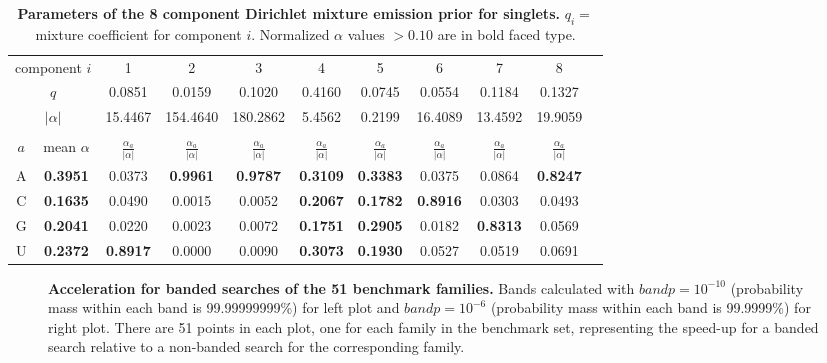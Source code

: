 \documentclass[11pt]{article}
\begin{document}
\begin{table}
\footnotesize
\begin{center}
\begin{tabular}{|c|c|c|c|c|c|c|c|c|c|c|} \hline
\multicolumn{2}{|c|}{component $i$} & 1 & 2 & 3 & 4 & 5 & 6 & 7 & 8 \\
\multicolumn{2}{|c|}{$q$} & 0.0851 & 0.0159 & 0.1020 & 0.4160 & 0.0745 & 0.0554 & 0.1184 & 0.1327 \\  
\multicolumn{2}{|c|}{$|\alpha|$} & 15.4467 & 154.4640 & 180.2862 & 5.4562 & 0.2199 & 16.4089 & 13.4592 & 19.9059 \\ \hline 
\multicolumn{10}{c}{} \\ \hline

$a$ & mean $\alpha$ & $\frac{\alpha_a}{|\alpha|}$ & $\frac{\alpha_a}{|\alpha|}$ & $\frac{\alpha_a}{|\alpha|}$ & $\frac{\alpha_a}{|\alpha|}$ & $\frac{\alpha_a}{|\alpha|}$ & $\frac{\alpha_a}{|\alpha|}$ & $\frac{\alpha_a}{|\alpha|}$ & $\frac{\alpha_a}{|\alpha|}$ \\ \hline 
A & \textbf{0.3951} & 0.0373 & \textbf{0.9961} & \textbf{0.9787} & \textbf{0.3109} & \textbf{0.3383} & 0.0375 & 0.0864 & \textbf{0.8247} \\  
C & \textbf{0.1635} & 0.0490 & 0.0015 & 0.0052 & \textbf{0.2067} & \textbf{0.1782} & \textbf{0.8916} & 0.0303 & 0.0493 \\  
G & \textbf{0.2041} & 0.0220 & 0.0023 & 0.0072 & \textbf{0.1751} & \textbf{0.2905} & 0.0182 & \textbf{0.8313} & 0.0569 \\  
U & \textbf{0.2372} & \textbf{0.8917} & 0.0000 & 0.0090 & \textbf{0.3073} & \textbf{0.1930} & 0.0527 & 0.0519 & 0.0691 \\ \hline 


\end{tabular}
\end{center}

\normalfont\rmfamily
\caption{\textbf{Parameters of the 8 component Dirichlet mixture
    emission prior for singlets.} $q_i =$ mixture coefficient for
    component $i$. Normalized $\alpha$ values $> 0.10$ are in bold
    faced type.}
\label{tbl:singlets}
\end{table}

\begin{figure}[hb]
\begin{center}
\caption{\textbf{Acceleration for banded searches of the
      51 benchmark families.} Bands calculated with $bandp =
  10^{-10}$ (probability mass within each band is 99.99999999\%) for
  left plot and $bandp = 10^{-6}$ (probability mass within each band
  is 99.9999\%) for right plot. There are 51 points in each plot, one
    for each family in the benchmark set, representing the speed-up
    for a banded search relative to a non-banded search for the
    corresponding family.}
\label{fig:scatter}
\end{center}
\end{figure}
\end{document}

